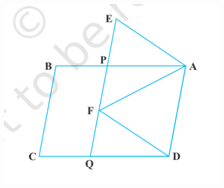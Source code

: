 \documentclass[12pt]{article}
\begin{document}
\begin{enumerate}
\begin{figure}[h]
	\centering
	\includegraphics[width=\columnwidth]{Figs/Fig9.27.png}
	\caption{}
	\label{fig:9.27}
\end{figure}
\end{enumerate}
\end{document}
